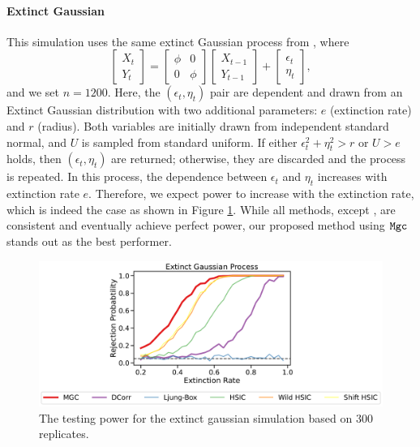\paragraph{Extinct Gaussian} 
This simulation uses the same extinct Gaussian process from \cite{shifthsic}, where
\begin{equation*}
    \begin{bmatrix}
    X_t\\
    Y_t
    \end{bmatrix}
    =
    \begin{bmatrix}
    \phi & 0\\
    0 & \phi
    \end{bmatrix}
    \begin{bmatrix}
    X_{t-1}\\
    Y_{t-1}
    \end{bmatrix}
    +
    \begin{bmatrix}
    \epsilon_t\\
    \eta_t
    \end{bmatrix},
\end{equation*}
and we set $n=1200$. Here, the $(\epsilon_t, \eta_t)$ pair are dependent and drawn from an Extinct Gaussian distribution with two additional parameters: $e$ (extinction rate) and $r$ (radius). Both variables are initially drawn from independent standard normal, and $U$ is sampled from standard uniform. If either $\epsilon_t^2 + \eta_t^2 > r$ or $U > e$ holds, then $(\epsilon_t, \eta_t)$ are returned; otherwise, they are discarded and the process is repeated. In this process, the dependence between $\epsilon_t$ and $\eta_t$ increases with extinction rate $e$. Therefore, we expect power to increase with the extinction rate, which is indeed the case as shown in Figure \ref{fig:extinct}. While all methods, except \LB, are consistent and eventually achieve perfect power, our proposed method using $\mathtt{Mgc}${} stands out as the best performer.

\begin{figure}[ht]
    \centering
    \includegraphics[width=1.0\textwidth]{figures/mgcx/figure3}
    \caption{The testing power for the extinct gaussian simulation based on $300$ replicates.} \label{fig:extinct}
\end{figure}

